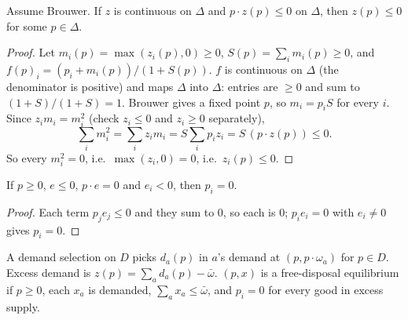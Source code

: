 \begin{theorem}
\label{thm:gnd}
\leanok
{}
Assume Brouwer. If $z$ is continuous on $\Delta$ and $p \cdot z(p) \le 0$ on $\Delta$, then $z(p) \le 0$ for some
$p \in \Delta$.
\end{theorem}
\begin{proof}
\leanok
Let $m_i(p) = \max(z_i(p), 0) \ge 0$, $S(p) = \sum_i m_i(p) \ge 0$, and
$f(p)_i = (p_i + m_i(p))/(1 + S(p))$. $f$ is continuous on $\Delta$ (the denominator is positive) and maps $\Delta$ into
$\Delta$: entries are $\ge 0$ and sum to $(1 + S)/(1 + S) = 1$. Brouwer gives a fixed point $p$, so
$m_i = p_i S$ for every $i$. Since $z_i m_i = m_i^2$ (check $z_i \le 0$ and $z_i \ge 0$ separately),
\[
\textstyle\sum_i m_i^2 = \sum_i z_i m_i = S \sum_i p_i z_i = S\, (p \cdot z(p)) \le 0.
\]
So every $m_i^2 = 0$, i.e.\ $\max(z_i, 0) = 0$, i.e.\ $z_i(p) \le 0$.
\end{proof}

\begin{lemma}
\label{lem:price_zero_excess}
\leanok
{}
If $p \ge 0$, $e \le 0$, $p \cdot e = 0$ and $e_i < 0$, then $p_i = 0$.
\end{lemma}
\begin{proof}
\leanok
Each term $p_j e_j \le 0$ and they sum to $0$, so each is $0$; $p_i e_i = 0$ with $e_i \neq 0$ gives $p_i = 0$.
\end{proof}

\begin{definition}
\label{def:excessDemand}
\leanok
{}
A demand selection on $D$ picks $d_a(p)$ in $a$'s demand at $(p, p \cdot \omega_a)$ for $p \in D$. Excess demand is
$z(p) = \sum_a d_a(p) - \bar\omega$. $(p, x)$ is a free-disposal equilibrium if $p \ge 0$, each $x_a$ is demanded,
$\sum_a x_a \le \bar\omega$, and $p_i = 0$ for every good in excess supply.
\end{definition}

